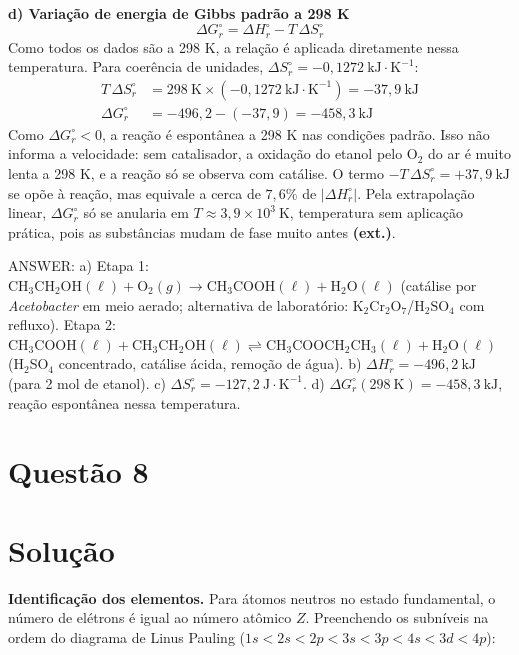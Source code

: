 \documentclass{article}%
\begin{document}
\textbf{d) Variação de energia de Gibbs padrão a 298 K}
\[
\Delta G^\circ_r = \Delta H^\circ_r - T\,\Delta S^\circ_r
\]
Como todos os dados são a 298 K, a relação é aplicada diretamente nessa temperatura. Para coerência de unidades, $\Delta S^\circ_r = -0{,}1272\ \text{kJ}\cdot\text{K}^{-1}$:
\begin{align*}
T\,\Delta S^\circ_r &= 298\ \text{K}\times(-0{,}1272\ \text{kJ}\cdot\text{K}^{-1}) = -37{,}9\ \text{kJ} \\
\Delta G^\circ_r &= -496{,}2 - (-37{,}9) = -458{,}3\ \text{kJ}
\end{align*}
Como $\Delta G^\circ_r<0$, a reação é espontânea a 298 K nas condições padrão. Isso não informa a velocidade: sem catalisador, a oxidação do etanol pelo O$_2$ do ar é muito lenta a 298 K, e a reação só se observa com catálise. O termo $-T\,\Delta S^\circ_r = +37{,}9\ \text{kJ}$ se opõe à reação, mas equivale a cerca de $7{,}6\%$ de $|\Delta H^\circ_r|$. Pela extrapolação linear, $\Delta G^\circ_r$ só se anularia em $T\approx 3{,}9\times 10^{3}\ \text{K}$, temperatura sem aplicação prática, pois as substâncias mudam de fase muito antes \textbf{(ext.)}.

ANSWER: a) Etapa 1: $\text{CH}_3\text{CH}_2\text{OH}(\ell) + \text{O}_2(g) \longrightarrow \text{CH}_3\text{COOH}(\ell) + \text{H}_2\text{O}(\ell)$ (catálise por \textit{Acetobacter} em meio aerado; alternativa de laboratório: $\text{K}_2\text{Cr}_2\text{O}_7$/$\text{H}_2\text{SO}_4$ com refluxo). Etapa 2: $\text{CH}_3\text{COOH}(\ell) + \text{CH}_3\text{CH}_2\text{OH}(\ell) \rightleftharpoons \text{CH}_3\text{COOCH}_2\text{CH}_3(\ell) + \text{H}_2\text{O}(\ell)$ (H$_2$SO$_4$ concentrado, catálise ácida, remoção de água). b) $\Delta H^\circ_r = -496{,}2\ \text{kJ}$ (para 2 mol de etanol). c) $\Delta S^\circ_r = -127{,}2\ \text{J}\cdot\text{K}^{-1}$. d) $\Delta G^\circ_r(298\ \text{K}) = -458{,}3\ \text{kJ}$, reação espontânea nessa temperatura.%
\newpage%
\section*{Questão 8}

\section*{Solução}

\textbf{Identificação dos elementos.} Para átomos neutros no estado fundamental, o número de elétrons é igual ao número atômico $Z$. Preenchendo os subníveis na ordem do diagrama de Linus Pauling ($1s<2s<2p<3s<3p<4s<3d<4p$):
\end{document}
